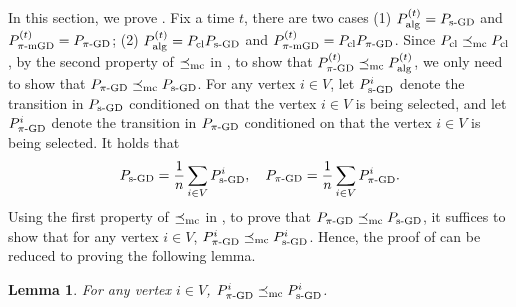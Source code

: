 \documentclass[11pt,a4paper]{article}
\newcommand{\mc}{\preceq_{\textnormal{mc}}}
\newcommand{\psim}{P_{\textnormal{s-GD}}}
\newtheorem{lemma}[theorem]{Lemma}
\theoremstyle{definition}
\begin{document}
In this section, we prove . Fix a time $t$, there are two cases (1) $P^{(t)}_{\textnormal{alg}} = \psim$ and $P^{(t)}_{\pi\textnormal{-mGD}} = P_{\pi\textnormal{-GD}}$; (2) $P^{(t)}_{\textnormal{alg}} = P_{\textnormal{cl}}\psim$ and $P^{(t)}_{\pi\textnormal{-mGD}} = P_{\textnormal{cl}}P_{\pi\textnormal{-GD}}$. Since $P_{\textnormal{cl}} \mc P_{\textnormal{cl}}$, by the second property of $\mc$ in , to show that $P^{(t)}_{\pi\textnormal{-GD}} \mc P^{(t)}_{\textnormal{alg}}$, we only need to show that $P_{\pi\textnormal{-GD}} \mc \psim$. For any vertex $i \in V$, let $\psim^i$ denote the transition in $\psim$ conditioned on that the vertex $i \in V$ is being selected, and let $P^i_{\pi\textnormal{-GD}}$ denote the transition in $P_{\pi\textnormal{-GD}}$ conditioned on that the vertex $i \in V$ is being selected. It holds that 
\begin{align*}
   \psim = \frac{1}{n}\sum_{i\in V} \psim^i, \quad P_{\pi\textnormal{-GD}} = \frac{1}{n}\sum_{i\in V} P^i_{\pi\textnormal{-GD}}.
\end{align*}
Using the first property of $\mc$ in , to prove that $P_{\pi\textnormal{-GD}} \mc \psim$, it suffices to show that for any vertex $i \in V$, $P^i_{\pi\textnormal{-GD}} \mc \psim^i$. Hence, the proof of  can be reduced to proving the following lemma.
\begin{lemma}\label{lem:phase-comparison-single-vertex}
For any vertex $i \in V$, $P^i_{\pi\textnormal{-GD}} \mc \psim^i$.
\end{lemma}
\end{document}
